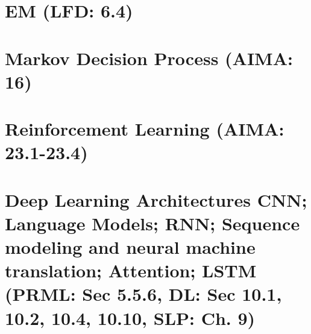\documentclass{article}
\begin{document}
\section{EM (LFD: 6.4)}

\newpage

\section{Markov Decision Process (AIMA: 16)}

\newpage

\section{Reinforcement Learning (AIMA: 23.1-23.4)}

\newpage

\section{Deep Learning Architectures CNN; Language Models; RNN; Sequence modeling and neural machine translation; Attention; LSTM (PRML: Sec 5.5.6, DL: Sec 10.1, 10.2, 10.4, 10.10, SLP: Ch. 9)}

\end{document}
